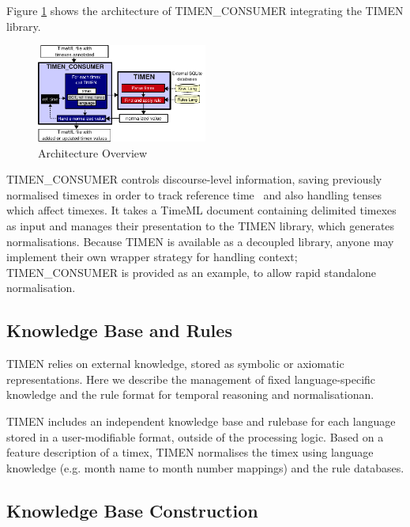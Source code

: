 \documentclass[10pt, a4paper]{article}
\begin{document}
Figure \ref{fig:arch} shows the architecture of TIMEN\_CONSUMER integrating the TIMEN library.

\begin{figure}[htbp]
 \begin{center}
  \includegraphics[width=0.5\textwidth,clip]{eps/TIMEN-architecture-supersimple.pdf}
  \caption{Architecture Overview}
  \label{fig:arch}
  \end{center}
\end{figure}


TIMEN\_CONSUMER controls discourse-level information, saving previously normalised timexes in order to track reference time~\cite{Reichenbach1947-Tense} and also handling tenses which affect timexes.
It takes a TimeML document containing delimited timexes as input and manages their presentation to the TIMEN library, which generates normalisations. Because TIMEN is available as a decoupled library, anyone may implement their own wrapper strategy for handling context; TIMEN\_CONSUMER is provided as an example, to allow rapid standalone normalisation.



\subsection{Knowledge Base and Rules}
\label{kb}

TIMEN relies on external knowledge, stored as symbolic or axiomatic representations. Here we describe the management of fixed language-specific knowledge and the rule format for temporal reasoning and normalisationan.

TIMEN includes an independent knowledge base and rulebase for each language stored in a user-modifiable format, outside of the processing logic.
Based on a feature description of a timex, TIMEN normalises the timex using language knowledge (e.g. month name to month number mappings) and the rule databases.

\subsection{Knowledge Base Construction}
\end{document}
